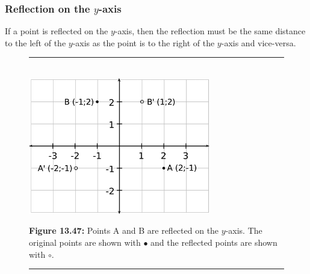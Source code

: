         
        \label{m39358*uid765}
            \subsubsection{ Reflection on the $y$-axis}
            \nopagebreak
            
          
          \label{m39358*id71525}If a point is reflected on the $y$-axis, then the reflection must be the same distance to the left of the \begin{math}y\end{math}-axis as the point is to the right of the \begin{math}y\end{math}-axis and vice-versa.\par 
          
    \setcounter{subfigure}{0}


	\begin{figure}[H] %
    \begin{center}
    \rule[.1in]{\figurerulewidth}{.005in} \\
        \label{m39358*uid7645!!!underscore!!!media}\label{m39358*uid76!!!underscore!!!printimage}\includegraphics[width=300px]{col11306.imgs/m39358_MG10C14_028.png} %
        
      \vspace{2pt}
    \vspace{\rubberspace}\par \begin{cnxcaption}
	  \small \textbf{Figure 13.47: }Points A and B are reflected on the $y$-axis. The original points are shown with \begin{math}\ensuremath{\bullet}\end{math} and the reflected points are shown with \begin{math}\circ \end{math}.
	\end{cnxcaption}
      
    \vspace{.1in}
    \rule[.1in]{\figurerulewidth}{.005in} \\
        
    \end{center}

 \end{figure}   

